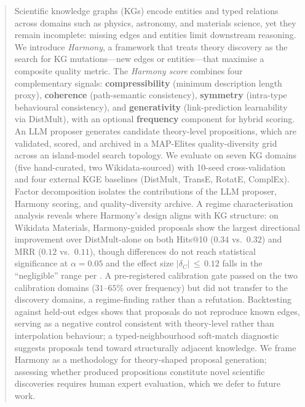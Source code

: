 \begin{abstract}
Scientific knowledge graphs (KGs) encode entities and typed relations across
domains such as physics, astronomy, and materials science, yet they remain
incomplete: missing edges and entities limit downstream reasoning.  We introduce
\emph{Harmony}, a framework that treats theory discovery as the search for KG
mutations---new edges or entities---that maximise a composite quality metric.
The \emph{Harmony score} combines four complementary signals: \textbf{compressibility}
(minimum description length proxy), \textbf{coherence} (path-semantic consistency),
\textbf{symmetry} (intra-type behavioural consistency),
and \textbf{generativity} (link-prediction learnability via DistMult), with an
optional \textbf{frequency} component for hybrid scoring.  An LLM
proposer generates candidate theory-level propositions, which are validated,
scored, and archived in a MAP-Elites quality-diversity grid across an
island-model search topology.  We evaluate on seven KG domains (five
hand-curated, two Wikidata-sourced) with 10-seed cross-validation and four
external KGE baselines (DistMult, TransE, RotatE, ComplEx).  Factor
decomposition isolates the contributions of the LLM proposer, Harmony scoring,
and quality-diversity archive.  A regime characterisation analysis reveals where
Harmony's design aligns with KG structure: on Wikidata Materials,
Harmony-guided proposals show the largest directional improvement over
DistMult-alone on both Hits@10 ($0.34$ vs.\ $0.32$) and MRR ($0.12$
vs.\ $0.11$), though differences do not reach statistical significance
at $\alpha = 0.05$ and the effect size $|\delta_C|\,\leq\,0.12$ falls in
the ``negligible'' range per \citet{cliff1993dominance}.  A
pre-registered calibration gate passed on the two calibration domains
($31$--$65\%$ over frequency) but did not transfer to the discovery
domains, a regime-finding rather than a refutation.
Backtesting against held-out edges shows that proposals do not reproduce
known edges, serving as a negative control consistent with theory-level
rather than interpolation behaviour; a typed-neighbourhood soft-match
diagnostic suggests proposals tend toward structurally adjacent knowledge.
We frame Harmony as a methodology for theory-shaped proposal generation;
assessing whether produced propositions constitute novel scientific
discoveries requires human expert evaluation, which we defer to future work.
\end{abstract}
